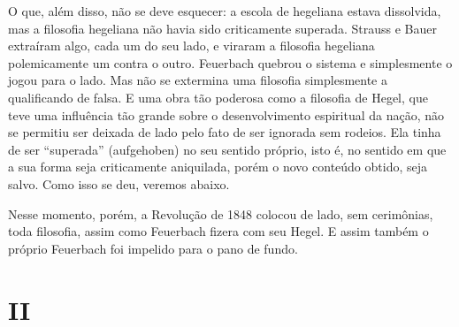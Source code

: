 O que, além disso, não se deve esquecer: a escola
de hegeliana estava
dissolvida, mas a filosofia hegeliana não havia sido criticamente
superada. Strauss e Bauer extraíram
algo, cada um do seu lado, e viraram a filosofia hegeliana polemicamente
um contra o
outro. Feuerbach quebrou
o sistema e simplesmente o jogou para o lado. Mas não se extermina uma
filosofia simplesmente a qualificando de falsa. E uma obra tão poderosa
como a filosofia
de Hegel,
que teve uma influência tão grande sobre o desenvolvimento espiritual da
nação, não se permitiu ser deixada de lado pelo fato de ser ignorada sem
rodeios. Ela tinha de ser ``superada'' (aufgehoben) no seu sentido
próprio, isto é, no sentido em que a sua forma seja criticamente
aniquilada, porém o novo conteúdo obtido, seja salvo. Como isso se deu,
veremos abaixo.

Nesse momento, porém, a Revolução de 1848 colocou de lado, sem
cerimônias, toda filosofia, assim como Feuerbach fizera com seu Hegel. E assim também o próprio Feuerbach foi impelido para o pano de fundo.

\quebra

\mbox{}
\vspace{2cm}

\section{II}


